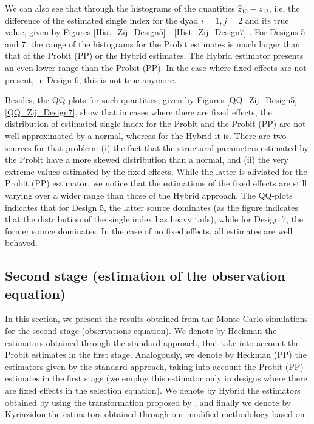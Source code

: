 We can also see that through the histograms of the quantities $\hat{z}_{12} - z_{12}$, i.e, the difference of the estimated single index for the dyad $i=1, j=2$ and its true value, given by Figures \ref{Hist_Zij_Design5} - \ref{Hist_Zij_Design7} . For Designs 5 and 7, the range of the histograms for the Probit estimates is much larger than that of the Probit (PP) or the Hybrid estimates. The Hybrid estimator presents an even lower range than the Probit (PP). In the case where fixed effects are not present, in Design 6, this is not true anymore.

Besides, the QQ-plots for such quantities, given by Figures \ref{QQ_Zij_Design5} - \ref{QQ_Zij_Design7}, show that in cases where there are fixed effects, the distribution of estimated single index for the Probit and the Probit (PP) are not well approximated by a normal, whereas for the Hybrid it is. There are two sources for that problem: (i) the fact that the structural parameters estimated by the Probit have a more skewed distribution than a normal, and (ii) the very extreme values estimated by the fixed effects. While the latter is aliviated for the Probit (PP) estimator, we notice that the estimations of the fixed effects are still varying over a wider range than those of the Hybrid approach. The QQ-plots indicates that for Design 5, the latter source dominates (as the figure indicates that the distribution of the single index has heavy tails), while for Design 7, the former source dominates. In the case of no fixed effects, all estimates are well behaved. 


\subsection{Second stage (estimation of the observation equation)}

In this section, we present the results obtained from the Monte Carlo simulations for the second stage (observations equation). We denote by Heckman the estimators obtained through the standard approach, that take into account the Probit estimates in the first stage. Analogously, we denote by Heckman (PP) the estimators given by the standard approach, taking into account the Probit (PP) estimates in the first stage (we employ this estimator only in designs where there are fixed effects in the selection equation). We denote by Hybrid the estimators obtained by using the transformation proposed by \cite{lee1983generalized}, and finally we denote by Kyriazidou the estimators obtained through our modified methodology based on \cite{kyriazidou1997estimation}.

